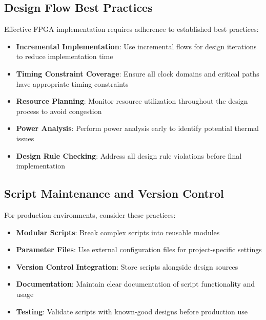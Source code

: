 \subsection{Design Flow Best Practices}

Effective FPGA implementation requires adherence to established best practices:

\begin{itemize}
    \item \textbf{Incremental Implementation}: Use incremental flows for design iterations to reduce implementation time
    \item \textbf{Timing Constraint Coverage}: Ensure all clock domains and critical paths have appropriate timing constraints
    \item \textbf{Resource Planning}: Monitor resource utilization throughout the design process to avoid congestion
    \item \textbf{Power Analysis}: Perform power analysis early to identify potential thermal issues
    \item \textbf{Design Rule Checking}: Address all design rule violations before final implementation
\end{itemize}

\subsection{Script Maintenance and Version Control}

For production environments, consider these practices:

\begin{itemize}
    \item \textbf{Modular Scripts}: Break complex scripts into reusable modules
    \item \textbf{Parameter Files}: Use external configuration files for project-specific settings
    \item \textbf{Version Control Integration}: Store scripts alongside design sources
    \item \textbf{Documentation}: Maintain clear documentation of script functionality and usage
    \item \textbf{Testing}: Validate scripts with known-good designs before production use
\end{itemize}